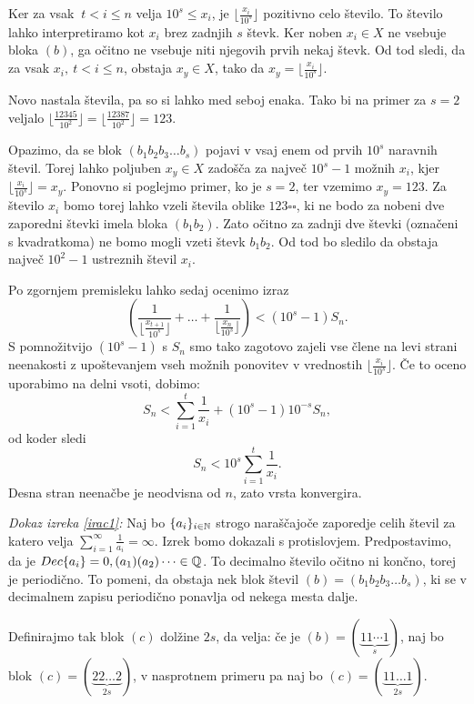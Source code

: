 \documentclass[twoside,11pt]{article}
\begin{document}
Ker za vsak $\ t < i \leq n$ velja $10^s \leq x_i$, je $\lfloor \frac{x_i}{10^s} \rfloor$ pozitivno celo število.
To število lahko interpretiramo kot $x_i$ brez zadnjih $s$ števk. 
Ker noben $x_i \in X$ ne vsebuje bloka $(b)$, 
ga očitno ne vsebuje niti njegovih prvih nekaj števk. 
Od tod sledi, da za vsak $x_i, \ t < i \leq n$, obstaja $x_y \in X$,
tako da $ x_y = \lfloor \frac{x_i}{10^s} \rfloor$.

Novo nastala števila, pa so si lahko med seboj enaka. Tako bi na primer za $s=2$ veljalo 
$ \lfloor\frac{12345}{10^2}\rfloor = \lfloor \frac{12387}{10^2}\rfloor = 123$.

Opazimo, da se blok $(b_1b_2b_3 \dots b_s)$ pojavi v vsaj enem od prvih $10^s$ naravnih števil.
Torej lahko poljuben $x_y \in X$ zadošča za največ $10^s - 1$ možnih $x_i$, kjer $\lfloor \frac{x_i}{10^s} \rfloor = x_y$.
%
Ponovno si poglejmo primer, ko je $s=2$, ter vzemimo $x_y = 123$. Za število $x_i$ bomo torej lahko vzeli števila oblike $123 \square \square$,
ki ne bodo za nobeni dve zaporedni števki imela bloka $(b_1b_2)$. 
Zato očitno za zadnji dve števki (označeni s kvadratkoma) ne bomo mogli vzeti števk $b_1b_2$. 
Od tod bo sledilo da obstaja največ $10^2 - 1$ ustreznih števil $x_i$.

Po zgornjem premisleku lahko sedaj ocenimo izraz 
\[(\frac{1}{ \lfloor\frac{x_{t + 1}}{10^s}\rfloor} + \dots + \frac{1}{\lfloor\frac{x_n}{10^s}\rfloor}) < (10^s - 1)S_n.\]
S pomnožitvijo $(10^s - 1)$ s $S_n$ smo tako zagotovo zajeli vse člene na levi strani neenakosti
z upoštevanjem vseh možnih ponovitev v vrednostih $\lfloor\frac{x_i}{10^s}\rfloor$.
Če to oceno uporabimo na delni vsoti, dobimo:
\[
    S_n < \sum_{i=1}^t \frac{1}{x_i} + (10^s - 1)10^{-s}S_n,
\] 
od koder sledi
\[
    S_n < 10^s \sum_{i=1}^t \frac{1}{x_i}.
\]
Desna stran neenačbe je neodvisna od $n$, zato vrsta konvergira.

\QED

\noindent
{\em Dokaz izreka \ref{irac1}:\/} Naj bo $\{a_i\}_{i\in \mathbb{N}}$ strogo naraščajoče zaporedje
celih števil za katero velja $\sum_{i=1}^{\infty}\frac{1}{a_i} = \infty$. Izrek bomo dokazali
s protislovjem. Predpostavimo, da je $Dec\{a_i\} = 0,(a_1)(a_2) \dots \in \mathbb{Q}$. To decimalno
število očitno ni končno, torej je periodično. 
To pomeni, da obstaja nek blok števil $(b) = (b_1b_2b_3 \dots b_s)$,
ki se v decimalnem zapisu periodično ponavlja od nekega mesta dalje. 

Definirajmo tak blok $(c)$ dolžine $2s$, da velja: 
če je $(b) = (\underbrace{11 \cdots 1}_{s})$, naj bo blok $(c) = (\underbrace{22\dots 2}_{2s})$, 
v nasprotnem primeru pa naj bo $(c) = (\underbrace{11\dots 1}_{2s})$.
\end{document}
